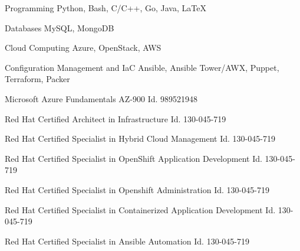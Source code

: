 
\begin{cvskills}

  \cvskill
    {Programming} %
    {Python, Bash, C/C++, Go, Java, LaTeX} %

  \cvskill
    {Databases} %
    {MySQL, MongoDB} %

  \cvskill
    {Cloud Computing} %
    {Azure, OpenStack, AWS} %

  \cvskill
    {Configuration Management and IaC} %
    {Ansible, Ansible Tower/AWX, Puppet, Terraform, Packer} %

  \cvskill
    {Microsoft Azure Fundamentals AZ-900} %
    {Id. 989521948 } %

  \cvskill
    {Red Hat Certified Architect in Infrastructure} %
    {Id. 130-045-719} %

  \cvskill
    {Red Hat Certified Specialist in Hybrid Cloud Management} %
    {Id. 130-045-719} %

  \cvskill
    {Red Hat Certified Specialist in OpenShift Application Development} %
    {Id. 130-045-719} %

  \cvskill
    {Red Hat Certified Specialist in Openshift Administration} %
    {Id. 130-045-719} %

  \cvskill
    {Red Hat Certified Specialist in Containerized Application Development} %
    {Id. 130-045-719} %

  \cvskill
    {Red Hat Certified Specialist in Ansible Automation} %
    {Id. 130-045-719} %


\end{cvskills}
